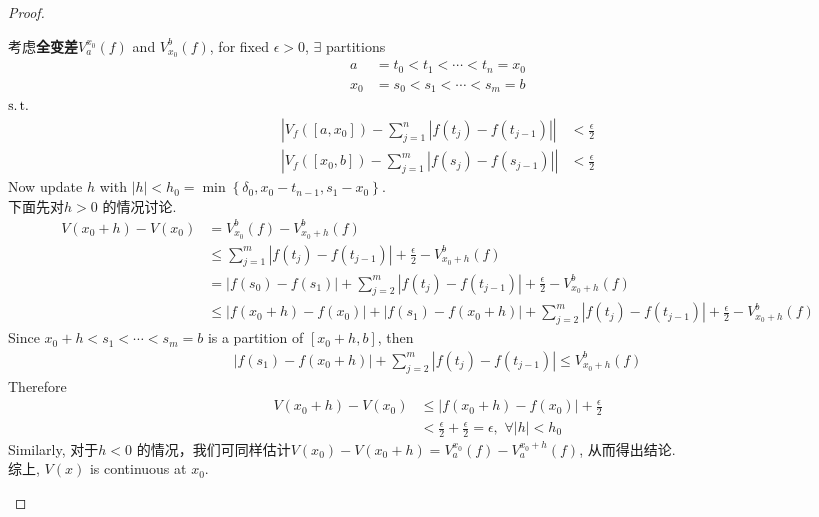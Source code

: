 \begin{proposition}
\begin{proof}
\begin{enumerate}
\begin{itemize}
					\vspace{1em}
					
					考虑\textbf{全变差}$V_{a}^{x_0}(f)$ and $V_{x_0}^{b}(f)$, for fixed $\epsilon > 0$, $\exists$ partitions
					\begin{align}
						a &= t_0 < t_1 < \cdots < t_n = x_0 \\
						x_0 &= s_0 < s_1 < \cdots < s_m = b
					\end{align}
					$\operatorname{s.t.}$
					\begin{align}
						\left| V_{f}([a , x_0]) - \sum_{j = 1}^{n}{\left| f(t_j) - f(t_{j - 1}) \right|} \right| 
						&< \frac{\epsilon}{2} \\
						\left| V_{f}([x_0 , b]) - \sum_{j = 1}^{m}{\left| f(s_j) - f(s_{j - 1}) \right|} \right| 
						&< \frac{\epsilon}{2}
					\end{align}
					Now update $h$ with $\left| h \right| < h_0 = \min{\left\{ \delta_0 , x_0 - t_{n - 1} , s_1 - x_0 \right\}}$. \\
					下面先对$h > 0$ 的情况讨论.
					\begin{align}
						V(x_0 + h) - V(x_0)
						&= V_{x_0}^{b}(f) - V_{x_0 + h}^{b}(f) \\
						&\leq \sum_{j = 1}^{m}{\left| f(t_j) - f(t_{j - 1}) \right|} + \frac{\epsilon}{2} - V_{x_0 + h}^{b}(f) \\
						&= \left| f(s_0) - f(s_1) \right| + \sum_{j = 2}^{m}{\left| f(t_j) - f(t_{j - 1}) \right|} + \frac{\epsilon}{2} - V_{x_0 + h}^{b}(f) \\
						&\leq \left| f(x_0 + h) - f(x_0) \right| + \left| f(s_1) - f(x_0 + h) \right| + \sum_{j = 2}^{m}{\left| f(t_j) - f(t_{j - 1}) \right|} + \frac{\epsilon}{2} - V_{x_0 + h}^{b}(f)
					\end{align}
					Since $x_0 + h < s_1 < \cdots < s_m = b$ is a partition of $[x_0 + h , b]$, then
					\begin{align}
						\left| f(s_1) - f(x_0 + h) \right| + \sum_{j = 2}^{m}{\left| f(t_j) - f(t_{j - 1}) \right|}
						\leq V_{x_0 + h}^{b}(f)
					\end{align}
					Therefore
					\begin{align}
						V(x_0 + h) - V(x_0)
						&\leq \left| f(x_0 + h) - f(x_0) \right| + \frac{\epsilon}{2} \\
						&< \frac{\epsilon}{2} + \frac{\epsilon}{2}
						= \epsilon , \,\, \forall \left| h \right| < h_0
					\end{align}
					Similarly, 对于$h < 0$ 的情况，我们可同样估计$V(x_0) - V(x_0 + h) = V_{a}^{x_0}(f) - V_{a}^{x_0 + h}(f)$, 从而得出结论. \\
					综上, $V(x)$ is continuous at $x_0$.
				\end{itemize}
			\end{enumerate}
		\end{proof}
	\end{proposition}




	\ifx\allfiles\undefined

\fi